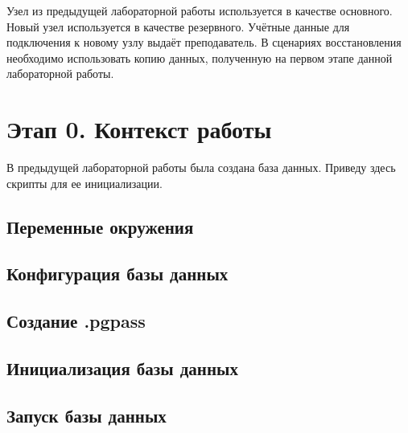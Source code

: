 \documentclass{article}
\begin{document}
Узел из предыдущей лабораторной работы используется в качестве основного. Новый узел используется в качестве резервного. Учётные данные для подключения к новому узлу выдаёт преподаватель. В сценариях восстановления необходимо использовать копию данных, полученную на первом этапе данной лабораторной работы.

\section{Этап 0. Контекст работы}

В предыдущей лабораторной работы была создана база данных. Приведу здесь скрипты для ее инициализации.

\subsection{Переменные окружения}



\subsection{Конфигурация базы данных}





\subsection{Создание .pgpass}



\subsection{Инициализация базы данных}



\subsection{Запуск базы данных}
\end{document}
